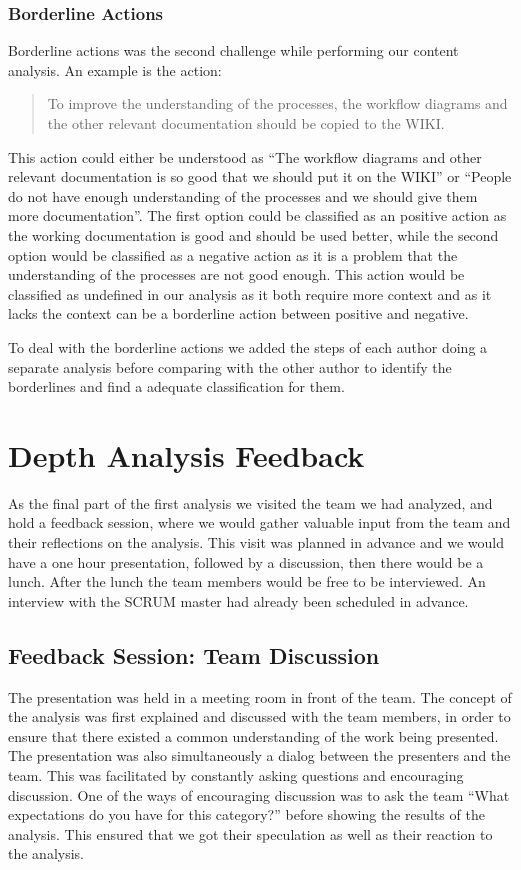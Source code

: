 \subsubsection{Borderline Actions}
Borderline actions was the second challenge while performing our content analysis. An example is the action: 
\begin{quote}
To improve the understanding of the processes, the workflow diagrams and the other relevant documentation should be copied to the WIKI.
\end{quote}
This action could either be understood as ``The workflow diagrams and other relevant documentation is so good that we should put it on the WIKI'' or ``People do not have enough understanding of the processes and we should give them more documentation''. The first option could be classified as an positive action as the working documentation is good and should be used better, while the second option would be classified as a negative action as it is a problem that the understanding of the processes are not good enough. This action would be classified as undefined in our analysis as it both require more context and as it lacks the context can be a borderline action between positive and negative. 

To deal with the borderline actions we added the steps of each author doing a separate analysis before comparing with the other author to identify the borderlines and find a adequate classification for them.


\section{Depth Analysis Feedback}
As the final part of the first analysis we visited the team we had analyzed, and hold a feedback session, where we would gather valuable input from the team and their reflections on the analysis. This visit was planned in advance and we would have a one hour presentation, followed by a discussion, then there would be a lunch. After the lunch the team members would be free to be interviewed. An interview with the SCRUM master had already been scheduled in advance.

\subsection{Feedback Session: Team Discussion}
The presentation was held in a meeting room in front of the team. The concept of the analysis was first explained and discussed with the team members, in order to ensure that there existed a common understanding of the work being presented. The presentation was also simultaneously a dialog between the presenters and the team. This was facilitated by constantly asking questions and encouraging discussion. One of the ways of encouraging discussion was to ask the team ``What expectations do you have for this category?'' before showing the results of the analysis. This ensured that we got their speculation as well as their reaction to the analysis. 

